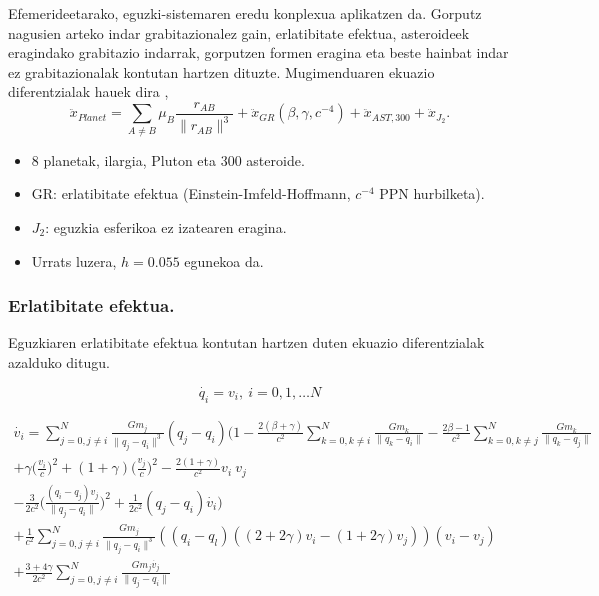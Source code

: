 Efemerideetarako, eguzki-sistemaren eredu konplexua aplikatzen da. Gorputz nagusien arteko indar grabitazionalez gain, erlatibitate efektua, asteroideek eragindako grabitazio indarrak, gorputzen formen eragina eta beste hainbat indar ez grabitazionalak kontutan hartzen dituzte. Mugimenduaren ekuazio diferentzialak hauek dira \cite{Feinga2015},      
      \begin{equation*}
      \ddot{x}_{Planet}= \sum_{A \neq B} \mu_B \frac{r_{AB}}{\|r_{AB}\|^3}+\ddot{x}_{GR} (\beta,\gamma,c^{-4})+ \ddot{x}_{AST,300}+ \ddot{x}_{J_2}.
      \end{equation*}
      
      \begin{itemize}
      \item $8$ planetak, ilargia, Pluton eta 300 asteroide.
      \item GR: erlatibitate efektua (Einstein-Imfeld-Hoffmann, $c^{-4}$ PPN hurbilketa).
      \item $J_2$: eguzkia esferikoa ez izatearen eragina. 
      \item Urrats luzera, $h=0.055$ egunekoa da.
      \end{itemize}   

\subsubsection*{Erlatibitate efektua.}
Eguzkiaren erlatibitate efektua kontutan hartzen duten ekuazio diferentzialak azalduko ditugu.

\begin{equation}
\dot{q_i}=v_i, \  i=0,1,\dots N
\end{equation}

\begin{multline} 
\dot{v_i}= \sum_{j=0,j \neq i}^{N} \frac{Gm_j}{\|q_j-q_i\|^3} (q_j-q_i)
           \bigg(1- \frac{2(\beta+\gamma)}{c^2} \sum\limits_{k=0, k \neq i}^{N} \frac{Gm_k}{\|q_k-q_i\|} 
                  - \frac{2\beta-1}{c^2}        \sum\limits_{k=0, k \neq j}^{N} \frac{Gm_k}{\|q_k-q_j\|} \\
                  + \gamma \big(\frac{v_i}{c}\big)^2 + (1+\gamma) \big(\frac{v_j}{c} \big)^2 
                  - \frac{2(1+\gamma)}{c^2} v_i \ v_j \\
                  - \frac{3}{2c^2} \big(\frac{(q_i-q_j) v_j}{\|q_j-q_i\|} \big)^2+                  
                  \frac{1}{2c^2}(q_j-q_i) \dot{v_i} \bigg) \\
           + \frac{1}{c^2} \sum_{j=0,j \neq i}^{N} \frac{Gm_j}{\|q_j-q_i\|^3} 
             ((q_i-q_l) ((2+2\gamma)v_i-(1+2\gamma)v_j)) (v_i-v_j) \\
           + \frac{3+4\gamma}{2c^2} \sum_{j=0,j \neq i}^{N} \frac{Gm_j \dot{v_j}}{\|q_j-q_i\|}                                      
\end{multline}

